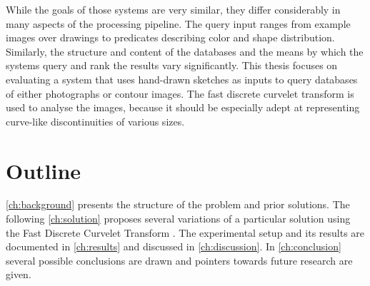 While the goals of those systems are very similar, they differ considerably in
many aspects of the processing pipeline. The query input ranges from example
images over drawings to predicates describing color and shape distribution.
Similarly, the structure and content of the databases and the means by which
the systems query and rank the results vary significantly. This thesis focuses
on evaluating a system that uses hand-drawn sketches as inputs to query
databases of either photographs or contour images. The fast discrete curvelet
transform \autocite{candes_fast_2006} is used to analyse the images, because it
should be especially adept at representing curve-like discontinuities of
various sizes.

\section{Outline}

\autoref{ch:background} presents the structure of the problem and prior
solutions. The following \autoref{ch:solution} proposes several variations of a
particular solution using the Fast Discrete Curvelet Transform
\autocite{candes_fast_2006}. The experimental setup and its results are
documented in \autoref{ch:results} and discussed in \autoref{ch:discussion}. In
\autoref{ch:conclusion} several possible conclusions are drawn and pointers
towards future research are given.

